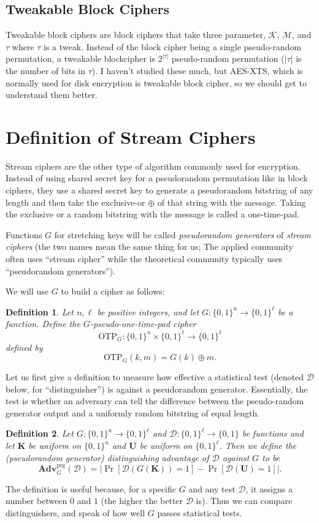 \documentclass[11pt]{article}
\newtheorem{definition}{Definition}
\newcommand{\msgs}{\mathcal{M}}
\newcommand{\keys}{\mathcal{K}}
\newcommand{\calD}{\mathcal{D}}
\newcommand{\Adv}{\mathbf{Adv}}
\newcommand{\AdvPRG}[2]{\Adv^{\mathrm{prg}}_{#1}({#2})}
\newcommand{\xor}{\oplus}
\newcommand{\bits}{\{0,1\}}
\newcommand{\bK}{\mathbf{K}}
\newcommand{\bU}{\mathbf{U}}
\newcommand{\otp}{\mathrm{OTP}}
\begin{document}
	\subsection{Tweakable Block Ciphers}
	
	Tweakable block ciphers are block ciphers that take three parameter, $\keys$, $\msgs$, and $\tau$ where $\tau$ is a tweak. Instead of the block cipher being a single pseudo-random permutation, a tweakable blockcipher is $2^{|\tau|}$ pseudo-random permutation ($|\tau|$ is the number of bits in $\tau$). I haven't studied these much, but AES-XTS, which is normally used for disk encryption is tweakable block cipher, so we should get to understand them better.
	
	\section{Definition of Stream Ciphers}
	
	Stream ciphers are the other type of algorithm commonly used for encryption. Instead of using shared secret key for a pseudorandom permutation like in block ciphers, they use a shared secret key to generate a pseudorandom bitstring of any length and then take the exclusive-or $\xor$ of that string with the message. Taking the exclusive or a random bitstring with the message is called a one-time-pad.
	
	Functions $G$ for stretching keys will be called \emph{pseudorandom generators}
	of \emph{stream ciphers} (the two names mean the same thing for us; The applied
	community often uses ``stream cipher'' while the theoretical community
	typically uses ``pseudorandom generators'').
	
	We will use $G$ to build a cipher as follows:
	\begin{definition}
		Let $n,\ell$ be positive integers, and let
		$G:\bits^n\to\bits^\ell$ be a function. Define the
		\emph{$G$-pseudo-one-time-pad cipher}
		\[
		\otp_G:\bits^n\times\bits^\ell\to\bits^\ell
		\]
		defined by
		\[
		\otp_G(k,m) = G(k)\oplus m.
		\]
	\end{definition}
	
	Let us first give a definition to measure how effective a statistical test
	(denoted $\calD$ below, for ``distinguisher'') is against a pseudorandom
	generator. Essentially, the test is whether an adversary can tell the difference between the pseudo-random generator output and a uniformly random bitstring of equal length.
	\begin{definition}
		Let $G:\bits^n\to\bits^\ell$ and $\calD:\bits^\ell \to \bits$ be functions
		and let $\bK$ be uniform on $\bits^n$ and $\bU$ be uniform on $\bits^\ell$.
		Then we define the \emph{(pseudorandom generator) distinguishing advantage
			of $\calD$ against $G$} to be
		\[
		\AdvPRG{G}{\calD} =
		\left|\Pr[\calD(G(\bK))=1]-\Pr[\calD(\bU)=1]\right|.
		\]
	\end{definition}
	The definition is useful because, for a specific $G$ and any test $\calD$, it
	assigns a number between $0$ and $1$ (the higher the better $\calD$ is).
	Thus we can compare distinguishers, and speak of how well $G$ passes
	statistical tests.
	
\end{document}
